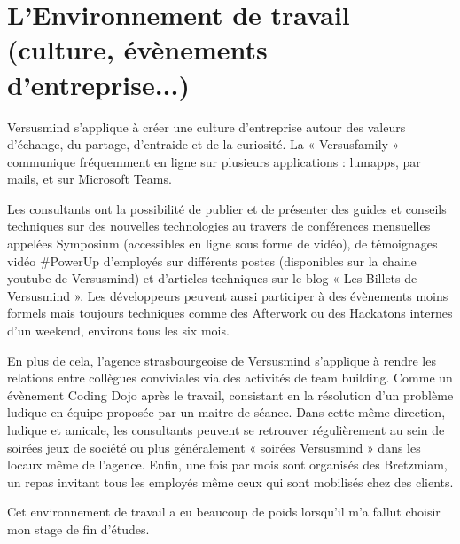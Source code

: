 \documentclass[12pt, a4paper]{report}
\newcommand\tab[1][1cm]{\hspace*{#1}}
\begin{document}
\section{L’Environnement de travail (culture, évènements d’entreprise...)}
\tab{}Versusmind s’applique à créer une culture d’entreprise autour des valeurs d’échange, du partage,
d’entraide et de la curiosité. La « Versusfamily » communique fréquemment en ligne sur plusieurs
applications : lumapps, par mails, et sur Microsoft Teams.\newline

Les consultants ont la possibilité de publier et de présenter des guides et conseils techniques sur des
nouvelles technologies au travers de conférences mensuelles appelées Symposium (accessibles en
ligne sous forme de vidéo), de témoignages vidéo \#PowerUp d’employés sur différents postes
(disponibles sur la chaine youtube de Versusmind) et d’articles techniques sur le blog « Les Billets de
Versusmind ». Les développeurs peuvent aussi participer à des évènements moins formels mais
toujours techniques comme des Afterwork ou des Hackatons internes d’un weekend, environs tous les
six mois.\newline

En plus de cela, l’agence strasbourgeoise de Versusmind s’applique à rendre les relations entre
collègues conviviales via des activités de team building. Comme un évènement Coding Dojo après le
travail, consistant en la résolution d’un problème ludique en équipe proposée par un maitre de séance.
Dans cette même direction, ludique et amicale, les consultants peuvent se retrouver régulièrement au
sein de soirées jeux de société ou plus généralement « soirées Versusmind » dans les locaux même de
l’agence. Enfin, une fois par mois sont organisés des Bretzmiam, un repas invitant tous les employés
même ceux qui sont mobilisés chez des clients.\newline

Cet environnement de travail a eu beaucoup de poids lorsqu’il m’a fallut choisir mon stage de fin d'études.
\end{document}
